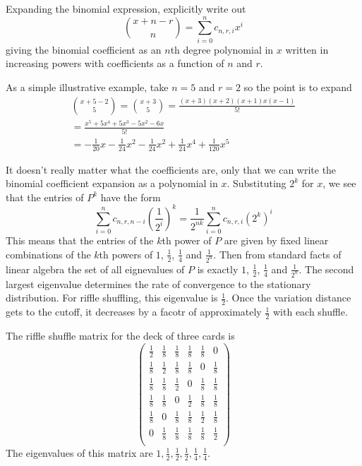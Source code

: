 \documentclass[12pt]{article}
\begin{document}
Expanding the binomial
expression, explicitly write out
\[
    \binom{x + n - r}{n} = \sum\limits_{i=0}^n c_{n,r,i} x^i
\] giving the binomial coefficient as an \( n \)th degree polynomial in \(
x \) written in increasing powers with coefficients as a function of \( n \) and \( r \).
\begin{example}
  As a simple illustrative example, take $n = 5$ and $r = 2$ so the
  point is to expand
  \begin{multline*}
    \binom{x+5 - 2}{5} = \binom{x+3}{5} =
    \frac{(x+3)(x+2)(x+1)x(x-1)}{5!} \\
    =  \frac{x^5 + 5 x^4 + 5 x^3 - 5 x^2 - 6 x}{5!} \\
    = - \frac{1}{20} x - \frac{1}{24} x^2 - \frac{1}{24} x^2 +
    \frac{1}{24} x^4   + \frac{1}{120} x^5  
  \end{multline*}
\end{example}
It doesn't
really matter what the coefficients are, only that we can write the
binomial coefficient expansion as a polynomial in \( x \).  Substituting
\( 2^k \) for \( x \), we see that the entries of \( P^k \) have the
form
\[
  \sum\limits_{i=0}^n c_{n,r,n-i} \left( \frac{1}{2^i} \right)^k
  = \frac{1}{2^{nk}} \sum\limits_{i=0}^n c_{n,r,i} \left( 2^k \right)^i
\] This means that the entries of the \( k \)th power of \( P \) are
given by fixed linear combinations of the \( k \)th powers of \( 1 \), \(
\frac{1}{2} \), \( \frac{1}{4} \) and \( \frac{1}{2^n} \).  Then from
standard facts of linear algebra the set of all eignevalues of \( P \)
is exactly \( 1 \), \( \frac{1}{2} \), \( \frac{1}{4} \) and \( \frac{1}
{2^n} \).  The second largest eigenvalue determines the rate of
convergence to the stationary distribution. For riffle shuffling, this
eigenvalue is \( \frac{1}{2} \).  Once the variation distance gets to
the cutoff, it decreases by a facotr of approximately \( \frac{1}{2} \)
with each shuffle.

\begin{example}
    The riffle shuffle matrix for the deck of three cards is
\[
    \begin{pmatrix}
        \frac{1}{2}     & \frac{1}{8}   & \frac{1}{8}   & \frac{1}{8}
        & \frac{1}{8}   & 0 \\
        \frac{1}{8}     & \frac{1}{2}   & \frac{1}{8}   & \frac{1}{8}
        & 0     & \frac{1}{8} \\
        \frac{1}{8}     & \frac{1}{8}   & \frac{1}{2}   & 0     & \frac{1}
        {8}     & \frac{1}{8} \\
        \frac{1}{8}     & \frac{1}{8}   & 0     & \frac{1}{2}   &
        \frac{1}{8}   & \frac{1}{8} \\
        \frac{1}{8}     & 0     & \frac{1}{8}   & \frac{1}{8}   & \frac{1}
        {2}     & \frac{1}{8} \\
        0       & \frac{1}{8}   & \frac{1}{8}   & \frac{1}{8}   & \frac{1}
        {8}     & \frac{1}{2} \\
    \end{pmatrix}
\]
    The eigenvalues of this matrix are \( 1, \frac{1}{2}, \frac{1}{2},
    \frac{1}{2}, \frac{1}{4}, \frac{1}{4} \).
\end{example}
\end{document}
